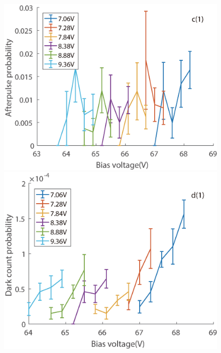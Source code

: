 \documentclass[%
 reprint,
superscriptaddress,
 amsmath,amssymb,
 aps,
]{revtex4-1}
\begin{document}
\begin{figure}
\begin{minipage}{0.24\linewidth}
\end{minipage}
\begin{minipage}{0.24\linewidth}
\centering
\includegraphics[width = 1\textwidth]{figure/90M/afterpulse1.eps}%
\end{minipage}
\begin{minipage}{0.24\linewidth}
\centering
\includegraphics[width = 1\textwidth]{figure/90M/darkcount.eps}%
\end{minipage}


\end{figure}
\end{document}
